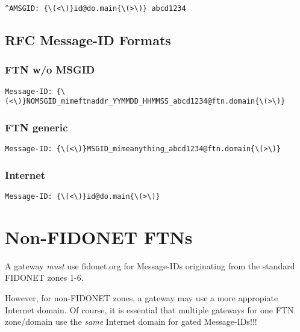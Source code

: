 \documentclass{article}
\begin{document}
\begin{verbatim}
^AMSGID: {\(<\)}id@do.main{\(>\)} abcd1234 
\end{verbatim}



\subsection{RFC Message-ID Formats }




\subsubsection{FTN w/o MSGID }

\begin{verbatim}
Message-ID: {\(<\)}NOMSGID_mimeftnaddr_YYMMDD_HHMMSS_abcd1234@ftn.domain{\(>\)} 
\end{verbatim}



\subsubsection{FTN generic }

\begin{verbatim}
Message-ID: {\(<\)}MSGID_mimeanything_abcd1234@ftn.domain{\(>\)} 
\end{verbatim}



\subsubsection{Internet }

\begin{verbatim}
Message-ID: {\(<\)}id@do.main{\(>\)} 
\end{verbatim}



\section{Non-FIDONET FTNs}



A gateway {\itshape must\/} use {\ttfamily fidonet.org} for Message-IDs originating from the standard FIDONET zones 1-6.

However, for non-FIDONET zones, a gateway may use a more appropiate Internet domain. Of course, it is essential that multiple gateways for one FTN zone/domain use the {\itshape same\/} Internet domain for gated Message-IDs!!! 
\end{document}
